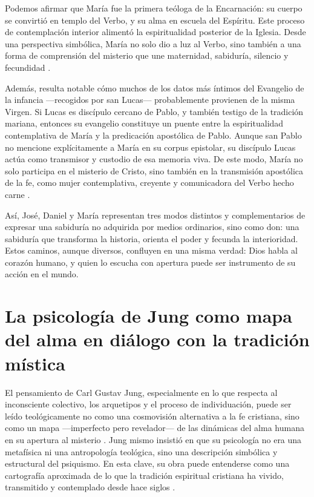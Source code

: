 \documentclass[a4paper,12pt]{article}
\begin{document}
Podemos afirmar que María fue la primera teóloga de la Encarnación: su cuerpo se convirtió en templo del Verbo, y su alma en escuela del Espíritu. Este proceso de contemplación interior alimentó la espiritualidad posterior de la Iglesia. Desde una perspectiva simbólica, María no solo dio a luz al Verbo, sino también a una forma de comprensión del misterio que une maternidad, sabiduría, silencio y fecundidad \cite{jung1964}.

Además, resulta notable cómo muchos de los datos más íntimos del Evangelio de la infancia —recogidos por san Lucas— probablemente provienen de la misma Virgen. Si Lucas es discípulo cercano de Pablo, y también testigo de la tradición mariana, entonces su evangelio constituye un puente entre la espiritualidad contemplativa de María y la predicación apostólica de Pablo. Aunque san Pablo no mencione explícitamente a María en su corpus epistolar, su discípulo Lucas actúa como transmisor y custodio de esa memoria viva. De este modo, María no solo participa en el misterio de Cristo, sino también en la transmisión apostólica de la fe, como mujer contemplativa, creyente y comunicadora del Verbo hecho carne \cite{jung1959}.

Así, José, Daniel y María representan tres modos distintos y complementarios de expresar una sabiduría no adquirida por medios ordinarios, sino como don: una sabiduría que transforma la historia, orienta el poder y fecunda la interioridad. Estos caminos, aunque diversos, confluyen en una misma verdad: Dios habla al corazón humano, y quien lo escucha con apertura puede ser instrumento de su acción en el mundo.


\section*{La psicología de Jung como mapa del alma en diálogo con la tradición mística}

El pensamiento de Carl Gustav Jung, especialmente en lo que respecta al inconsciente colectivo, los arquetipos y el proceso de individuación, puede ser leído teológicamente no como una cosmovisión alternativa a la fe cristiana, sino como un mapa —imperfecto pero revelador— de las dinámicas del alma humana en su apertura al misterio \cite{jung1959,jung1971}. Jung mismo insistió en que su psicología no era una metafísica ni una antropología teológica, sino una descripción simbólica y estructural del psiquismo. En esta clave, su obra puede entenderse como una cartografía aproximada de lo que la tradición espiritual cristiana ha vivido, transmitido y contemplado desde hace siglos \cite{jung1959}.
\end{document}
